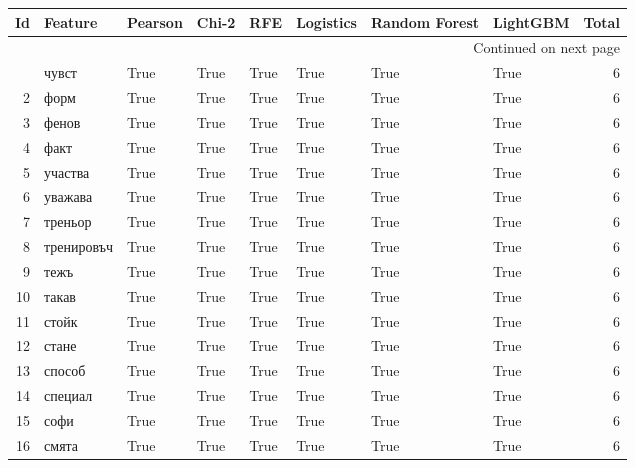 \begin{longtable}{rlllllllr}
\toprule
  Id &     Feature &  Pearson &  Chi-2 &    RFE &  Logistics &  Random Forest &  LightGBM &  Total \\
\midrule
\endhead
\midrule
\multicolumn{9}{r}{{Continued on next page}} \\
\midrule
\endfoot

\bottomrule
\endlastfoot
   1 &       чувст &     True &   True &   True &       True &           True &      True &      6 \\
   2 &        форм &     True &   True &   True &       True &           True &      True &      6 \\
   3 &       фенов &     True &   True &   True &       True &           True &      True &      6 \\
   4 &        факт &     True &   True &   True &       True &           True &      True &      6 \\
   5 &     участва &     True &   True &   True &       True &           True &      True &      6 \\
   6 &     уважава &     True &   True &   True &       True &           True &      True &      6 \\
   7 &     треньор &     True &   True &   True &       True &           True &      True &      6 \\
   8 &  тренировъч &     True &   True &   True &       True &           True &      True &      6 \\
   9 &        тежъ &     True &   True &   True &       True &           True &      True &      6 \\
  10 &       такав &     True &   True &   True &       True &           True &      True &      6 \\
  11 &       стойк &     True &   True &   True &       True &           True &      True &      6 \\
  12 &       стане &     True &   True &   True &       True &           True &      True &      6 \\
  13 &      способ &     True &   True &   True &       True &           True &      True &      6 \\
  14 &     специал &     True &   True &   True &       True &           True &      True &      6 \\
  15 &        софи &     True &   True &   True &       True &           True &      True &      6 \\
  16 &       смята &     True &   True &   True &       True &           True &      True &      6 \\

\end{longtable}
